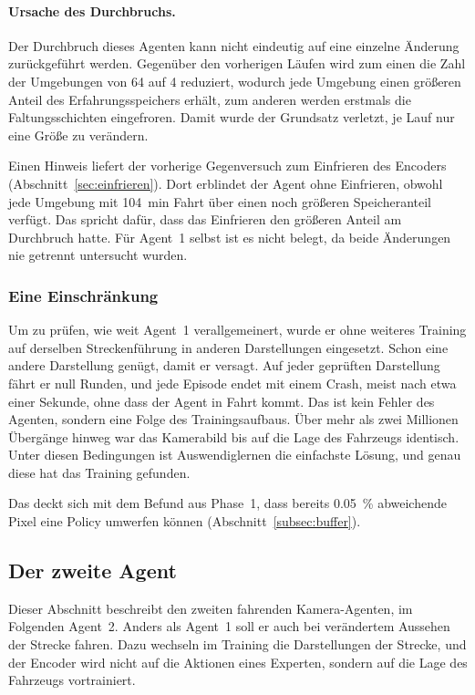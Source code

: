 \paragraph{Ursache des Durchbruchs.}
Der Durchbruch dieses Agenten kann nicht eindeutig auf eine einzelne Änderung zurückgeführt werden. Gegenüber den vorherigen Läufen wird zum einen die Zahl der Umgebungen von 64 auf 4 reduziert, wodurch jede Umgebung einen größeren Anteil des Erfahrungsspeichers erhält, zum anderen werden erstmals die Faltungsschichten eingefroren. Damit wurde der Grundsatz verletzt, je Lauf nur eine Größe zu verändern.

Einen Hinweis liefert der vorherige Gegenversuch zum Einfrieren des Encoders (Abschnitt~\ref{sec:einfrieren}). Dort erblindet der Agent ohne Einfrieren, obwohl jede Umgebung mit \SI{104}{\minute} Fahrt über einen noch größeren Speicheranteil verfügt. Das spricht dafür, dass das Einfrieren den größeren Anteil am Durchbruch hatte. Für Agent~1 selbst ist es nicht belegt, da beide Änderungen nie getrennt untersucht wurden.

\subsubsection{Eine Einschränkung}
\label{subsec:agent1_einschraenkung}

Um zu prüfen, wie weit Agent~1 verallgemeinert, wurde er ohne weiteres Training auf derselben Streckenführung in anderen Darstellungen eingesetzt. Schon eine andere Darstellung genügt, damit er versagt. Auf jeder geprüften Darstellung fährt er null Runden, und jede Episode endet mit einem Crash, meist nach etwa einer Sekunde, ohne dass der Agent in Fahrt kommt. Das ist kein Fehler des Agenten, sondern eine Folge des Trainingsaufbaus. Über mehr als zwei Millionen Übergänge hinweg war das Kamerabild bis auf die Lage des Fahrzeugs identisch. Unter diesen Bedingungen ist Auswendiglernen die einfachste Lösung, und genau diese hat das Training gefunden.

Das deckt sich mit dem Befund aus Phase~1, dass bereits \SI{0.05}{\percent} abweichende Pixel eine Policy umwerfen können (Abschnitt~\ref{subsec:buffer}).

\subsection{Der zweite Agent}
\label{sec:agent2}

Dieser Abschnitt beschreibt den zweiten fahrenden Kamera-Agenten, im Folgenden Agent~2. Anders als Agent~1 soll er auch bei verändertem Aussehen der Strecke fahren. Dazu wechseln im Training die Darstellungen der Strecke, und der Encoder wird nicht auf die Aktionen eines Experten, sondern auf die Lage des Fahrzeugs vortrainiert.

